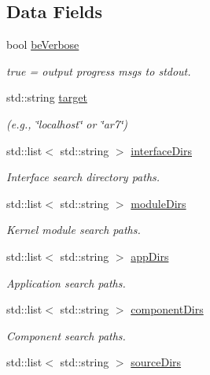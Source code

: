 \subsection*{Data Fields}
\begin{DoxyCompactItemize}
\item 
bool \hyperlink{structmk_1_1_build_params__t_a553f6de2c0dbc2d6123294c454835c5c}{be\+Verbose}
\begin{DoxyCompactList}\small\item\em true = output progress msgs to stdout. \end{DoxyCompactList}\item 
std\+::string \hyperlink{structmk_1_1_build_params__t_af772341ef408fe56158a5099253fb4c0}{target}
\begin{DoxyCompactList}\small\item\em (e.\+g., \char`\"{}localhost\char`\"{} or \char`\"{}ar7\char`\"{}) \end{DoxyCompactList}\item 
std\+::list$<$ std\+::string $>$ \hyperlink{structmk_1_1_build_params__t_a8758dc3212617e083cd85f76d63105ff}{interface\+Dirs}
\begin{DoxyCompactList}\small\item\em Interface search directory paths. \end{DoxyCompactList}\item 
std\+::list$<$ std\+::string $>$ \hyperlink{structmk_1_1_build_params__t_a80145edd6bbe35fd79fce6e9075906ef}{module\+Dirs}
\begin{DoxyCompactList}\small\item\em Kernel module search paths. \end{DoxyCompactList}\item 
std\+::list$<$ std\+::string $>$ \hyperlink{structmk_1_1_build_params__t_aeed5fec0e9fb17781a31f61bcebcf65e}{app\+Dirs}
\begin{DoxyCompactList}\small\item\em Application search paths. \end{DoxyCompactList}\item 
std\+::list$<$ std\+::string $>$ \hyperlink{structmk_1_1_build_params__t_a9f73582ec04a0c7122c62139d270f857}{component\+Dirs}
\begin{DoxyCompactList}\small\item\em Component search paths. \end{DoxyCompactList}\item 
std\+::list$<$ std\+::string $>$ \hyperlink{structmk_1_1_build_params__t_a1c6059bea4ddee70038a05aba561873a}{source\+Dirs}

\end{DoxyCompactItemize}
